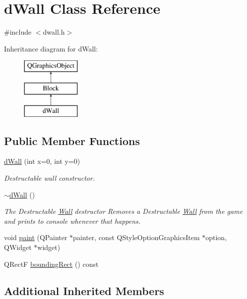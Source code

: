 \hypertarget{classd_wall}{\section{d\-Wall Class Reference}
\label{classd_wall}
}


{\ttfamily \#include $<$dwall.\-h$>$}

Inheritance diagram for d\-Wall\-:\begin{figure}[H]
\begin{center}
\leavevmode
\includegraphics[height=3.000000cm]{classd_wall}
\end{center}
\end{figure}
\subsection*{Public Member Functions}
\begin{DoxyCompactItemize}
\item 
\hyperlink{classd_wall_a09862932157c8e5f8a59b22b3222d816}{d\-Wall} (int x=0, int y=0)
\begin{DoxyCompactList}\small\item\em Destructable wall constructor. \end{DoxyCompactList}\item 
\hyperlink{classd_wall_ae3e072cee7b80cf20387c3d634cb994a}{$\sim$d\-Wall} ()
\begin{DoxyCompactList}\small\item\em The Destructable \hyperlink{class_wall}{Wall} destructor Removes a Destructable \hyperlink{class_wall}{Wall} from the game and prints to console whenever that happens. \end{DoxyCompactList}\item 
void \hyperlink{classd_wall_aeaec158ea8576bfe6d40d8197ffceaf6}{paint} (Q\-Painter $\ast$painter, const Q\-Style\-Option\-Graphics\-Item $\ast$option, Q\-Widget $\ast$widget)
\item 
Q\-Rect\-F \hyperlink{classd_wall_a84d4bba890333394f10c5497379d894c}{bounding\-Rect} () const 
\end{DoxyCompactItemize}
\subsection*{Additional Inherited Members}


